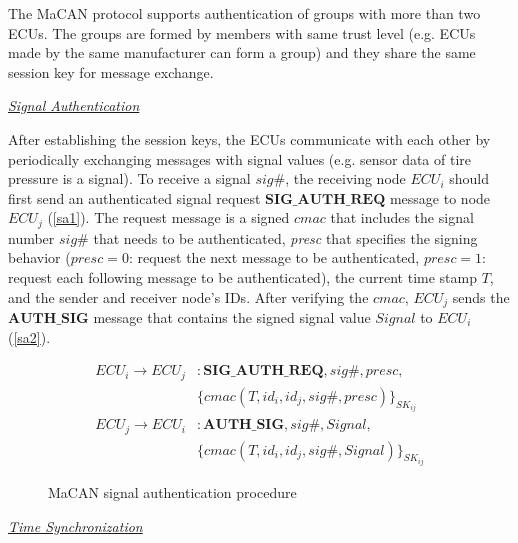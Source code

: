 \vspace*{-0.1in}
The MaCAN protocol supports authentication of groups with more than two ECUs. The groups are formed by members with same trust level (e.g. ECUs made by the same manufacturer can form a group) and they share the same session key for message exchange.    

\vspace*{0.1in}
\noindent \underline{\textit{Signal Authentication}}

\vspace*{0.05in}
After establishing the session keys, the ECUs communicate with each other by periodically exchanging messages with signal values (e.g. sensor data of tire pressure is a signal). To receive a signal $sig\#$, the receiving node $ECU_i$ should first send an authenticated signal request $\mathbf{SIG\_AUTH\_REQ}$ message to node $ECU_j$ (\ref{sa1}). The request message is a signed $cmac$ that includes the signal number $sig\#$ that needs to be authenticated, \textit{presc} that specifies the signing behavior ($presc =0$: request the next message to be authenticated, $presc =1$: request each following message to be authenticated), the current time stamp $T$, and the sender and receiver node's IDs. After verifying the $cmac$, $ECU_j$ sends the $\mathbf{AUTH\_SIG}$ message that contains the signed signal value $Signal$ to $ECU_i$ (\ref{sa2}).                  

\vspace*{-0.15in}
\begin{figure}[ht]
\begin{align}
 ECU_i \rightarrow ECU_j &: \mathbf{SIG\_AUTH\_REQ}, sig\#, presc, \nonumber \\ 
                         &\{cmac(T, id_i, id_j, sig\#, presc)\}_{SK_{ij}} \label{sa1}\\
 ECU_j \rightarrow ECU_i &: \mathbf{AUTH\_SIG}, sig\#, Signal, \nonumber \label{sa2}\\ 
                         &\{cmac(T, id_i, id_j, sig\#, Signal)\}_{SK_{ij}} 
\end{align}
\vspace*{-0.2in}
\caption{MaCAN signal authentication procedure} \label{fig:sauth}
\end{figure}

\vspace*{-0.1in}
\noindent \underline{\textit{Time Synchronization}} 

